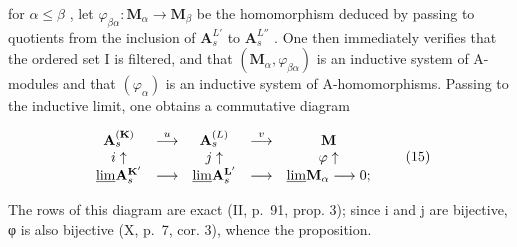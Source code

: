for \(\alpha \leqslant \beta\) , let \(\varphi_{\beta \alpha}: \mathbf{M}_{\alpha} \to \mathbf{M}_{\beta}\) be the homomorphism deduced by passing to quotients from the inclusion of \(\mathbf{A}_s^{L'}\) to \(\mathbf{A}_s^{L''}\) . One then immediately verifies that the ordered set I is filtered, and that \((\mathbf{M}_{\alpha}, \varphi_{\beta \alpha})\) is an inductive system of A-modules and that \((\varphi_{\alpha})\) is an inductive system of A-homomorphisms. Passing to the inductive limit, one obtains a commutative diagram

\[
\begin{array}{c c c c c} \mathbf {A} _ {s} ^ {(\mathbf {K})} & \stackrel {{u}} {{\longrightarrow}} & \mathbf {A} _ {s} ^ {(L)} & \stackrel {{v}} {{\longrightarrow}} & \mathbf {M} \\ i \uparrow & & j \uparrow & & \varphi \uparrow \\ \underline {{\lim}} \mathbf {A} _ {s} ^ {\mathbf {K} ^ {\prime}} & \longrightarrow & \underline {{\lim}} \mathbf {A} _ {s} ^ {\mathbf {L} ^ {\prime}} & \longrightarrow & \underline {{\lim}} \mathbf {M} _ {\alpha} \longrightarrow 0; \end{array}\tag{15}
\]

The rows of this diagram are exact (II, p.~91, prop. 3); since i and j are bijective, φ is also bijective (X, p.~7, cor. 3), whence the proposition.

